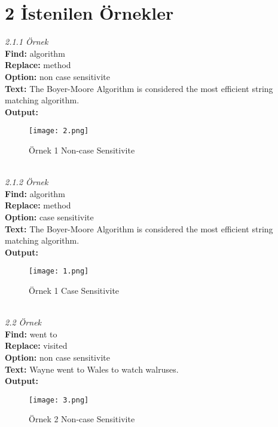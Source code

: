 \documentclass[11pt]{article}
\begin{document}
\section{2 İstenilen Örnekler}
\textit{\large{2.1.1 Örnek}}\\
\hspace*{1cm} \textbf{Find:} algorithm \\
\hspace*{1cm} \textbf{Replace:} method \\
\hspace*{1cm} \textbf{Option:} non case sensitivite \\
\hspace*{1cm} \textbf{Text:} The Boyer-Moore Algorithm is considered the most
efficient string matching algorithm. \\
\hspace*{1cm} \textbf{Output:}
\begin{figure}[h!]
\centering
\texttt{[image: 2.png]}
\caption{Örnek 1 Non-case Sensitivite}
\label{fig:istenilen}
\end{figure}
\\
\textit{\large{2.1.2 Örnek}}\\
\hspace*{1cm} \textbf{Find:} algorithm \\
\hspace*{1cm} \textbf{Replace:} method \\
\hspace*{1cm} \textbf{Option:} case sensitivite \\
\hspace*{1cm} \textbf{Text:} The Boyer-Moore Algorithm is considered the most efficient string matching algorithm. \\
\hspace*{1cm} \textbf{Output:}
\begin{figure}[h!]
\centering
\texttt{[image: 1.png]}
\caption{Örnek 1 Case Sensitivite}
\label{fig:istenilen2}
\end{figure}
\pagebreak
\\
\textit{\large{2.2 Örnek}}\\
\hspace*{1cm} \textbf{Find:} went to \\
\hspace*{1cm} \textbf{Replace:} visited \\
\hspace*{1cm} \textbf{Option:} non case sensitivite \\
\hspace*{1cm} \textbf{Text:} Wayne went to Wales to watch walruses. \\
\hspace*{1cm} \textbf{Output:}
\begin{figure}[h!]
\centering
\texttt{[image: 3.png]}
\caption{Örnek 2 Non-case Sensitivite}
\label{fig:istenilen3}
\end{figure}\\
\pagebreak
\end{document}
